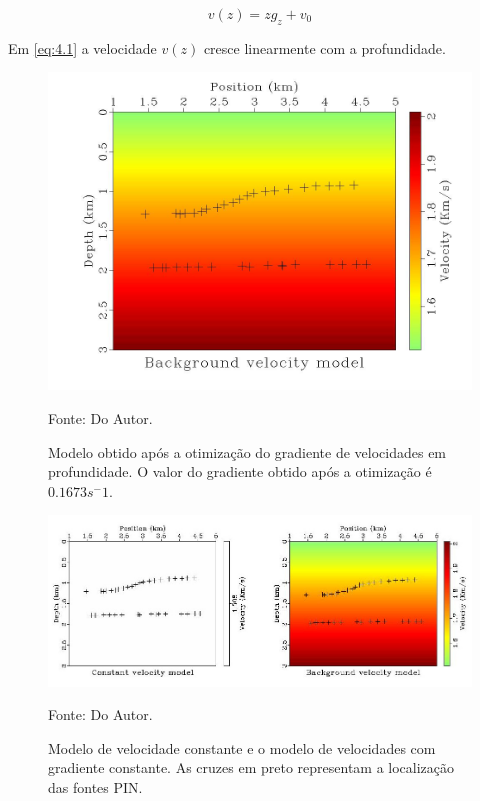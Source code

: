 \begin{equation}
\label{eq:4.1}
v(z)=z g_z+v_0
\end{equation}

Em \ref{eq:4.1} a velocidade $v(z)$ cresce linearmente com a profundidade.

\begin{figure}[H]
\caption{Modelo obtido após a otimização do gradiente de velocidades em profundidade.
O valor do gradiente obtido após a otimização é $0.1673 s^-1$.}
\begin{center}
\includegraphics[scale=0.3]{images/gzvel.jpeg}
\vspace{-0.3cm}
\end{center}
\begin{center}
 Fonte: Do Autor.
\end{center}
\label{fig:3.2}
\end{figure}

\begin{figure}[H]
\caption{Modelo de velocidade constante e o modelo de velocidades com gradiente constante.
As cruzes em preto representam a localização das fontes PIN.}
\begin{center}
\includegraphics[scale=2]{images/compare.jpeg}
\vspace{-0.3cm}
\end{center}
\begin{center}
 Fonte: Do Autor.
\end{center}
\label{fig:3.3}
\end{figure}


